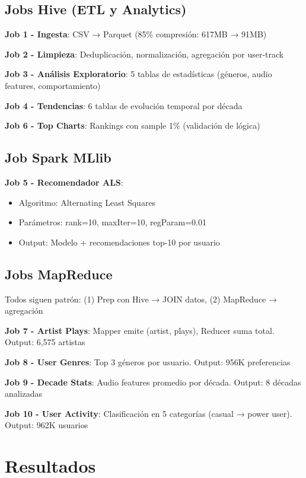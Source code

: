 \documentclass[11pt,a4paper]{article}
\begin{document}
\subsection{Jobs Hive (ETL y Analytics)}

\textbf{Job 1 - Ingesta}: CSV → Parquet (85\% compresión: 617MB → 91MB)

\textbf{Job 2 - Limpieza}: Deduplicación, normalización, agregación por user-track

\textbf{Job 3 - Análisis Exploratorio}: 5 tablas de estadísticas (géneros, audio features, comportamiento)

\textbf{Job 4 - Tendencias}: 6 tablas de evolución temporal por década

\textbf{Job 6 - Top Charts}: Rankings con sample 1\% (validación de lógica)

\subsection{Job Spark MLlib}

\textbf{Job 5 - Recomendador ALS}:
\begin{itemize}
    \item Algoritmo: Alternating Least Squares
    \item Parámetros: rank=10, maxIter=10, regParam=0.01
    \item Output: Modelo + recomendaciones top-10 por usuario
\end{itemize}

\subsection{Jobs MapReduce}

Todos siguen patrón: (1) Prep con Hive → JOIN datos, (2) MapReduce → agregación

\textbf{Job 7 - Artist Plays}: Mapper emite (artist, plays), Reducer suma total. Output: 6,575 artistas

\textbf{Job 8 - User Genres}: Top 3 géneros por usuario. Output: 956K preferencias

\textbf{Job 9 - Decade Stats}: Audio features promedio por década. Output: 8 décadas analizadas

\textbf{Job 10 - User Activity}: Clasificación en 5 categorías (casual → power user). Output: 962K usuarios

\section{Resultados}
\end{document}
